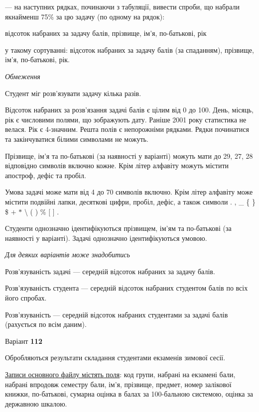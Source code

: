 \documentclass[11pt, ukrainian]{article}
\begin{document}
{\noindent}--- на наступних рядках, починаючи з табуляції, вивести спроби, що набрали якнайменш 75\% за цю задачу (по одному на рядок):\par
відсоток набраних за задачу балів, прізвище, ім’я, по-батькові, рік

{\noindent}у такому сортуванні: відсоток набраних за задачу балів (за спаданням), прізвище, ім’я, по-батькові, рік.


\bigskip\textit{Обмеження}

Студент міг розв’язувати задачу кілька разів.

Відсоток набраних за розв’язання задачі балів є цілим від 0 до 100.
День, місяць, рік є числовими полями, що зображують дату.
Раніше 2001 року статистика не велася. Рік є 4-значним.
Решта полів є непорожніми рядками.
Рядки починатися та закінчуватися білими символами не можуть.

Прізвище, ім’я та по-батькові (за наявності у варіанті) можуть мати до 29, 27, 28 відповідно символів включно кожне. 
Крім літер алфавіту можуть містити апостроф, дефіс та пробіл.

Умова задачі може мати від 4 до 70 символів включно.
Крім літер алфавіту може містити подвійні лапки, десяткові цифри, пробіл, дефіс,
а також символи . , \_ \{ \} \$ $+$ $*$ {\textbackslash} ( ) \% $[$ $]$ .

Студенти однозначно ідентифікуються прізвищем, ім’ям та по-батькові (за наявності у варіанті).
Задачі однозначно ідентифікуються умовою.

\bigskip\textit{Для деяких варіантів може знадобитись}

Розв'язуваність задачі --- середній відсоток набраних за задачу балів.

Розв'язуваність студента --- середній відсоток набраних студентом балів по всіх його спробах.

Розв'язуваність --- середній відсоток набраних студентами за задачі балів (рахується по всім даним).




\par
\newpage
{\center Варіант  \No \textbf { 112 }\par}
\bigskip
Обробляються результати складання студентами екзаменів зимової сесії.

\underline{Записи основного файлу містять поля}: код групи, набрані на екзамені бали, набрані впродовж семестру бали, ім’я, прізвище, предмет, номер залікової книжки, по-батькові, сумарна оцінка в балах за 100-бальною системою, оцінка за державною шкалою.
\end{document}
